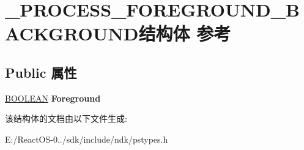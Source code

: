 \hypertarget{struct___p_r_o_c_e_s_s___f_o_r_e_g_r_o_u_n_d___b_a_c_k_g_r_o_u_n_d}{}\section{\+\_\+\+P\+R\+O\+C\+E\+S\+S\+\_\+\+F\+O\+R\+E\+G\+R\+O\+U\+N\+D\+\_\+\+B\+A\+C\+K\+G\+R\+O\+U\+N\+D结构体 参考}
\label{struct___p_r_o_c_e_s_s___f_o_r_e_g_r_o_u_n_d___b_a_c_k_g_r_o_u_n_d}
\subsection*{Public 属性}
\begin{DoxyCompactItemize}
\item 
\mbox{\label{struct___p_r_o_c_e_s_s___f_o_r_e_g_r_o_u_n_d___b_a_c_k_g_r_o_u_n_d_a3b434db7d60e08c0c8c86858c08d38dd}} 
\hyperlink{_processor_bind_8h_a112e3146cb38b6ee95e64d85842e380a}{B\+O\+O\+L\+E\+AN} {\bfseries Foreground}
\end{DoxyCompactItemize}


该结构体的文档由以下文件生成\+:\begin{DoxyCompactItemize}
\item 
E\+:/\+React\+O\+S-\/0../sdk/include/ndk/pstypes.\+h\end{DoxyCompactItemize}
